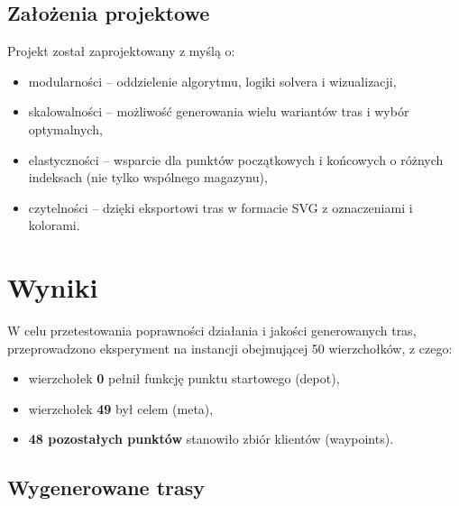 \documentclass{article}
\begin{document}
\subsection*{Założenia projektowe}

Projekt został zaprojektowany z myślą o:
\begin{itemize}
    \item modularności – oddzielenie algorytmu, logiki solvera i wizualizacji,
    \item skalowalności – możliwość generowania wielu wariantów tras i wybór optymalnych,
    \item elastyczności – wsparcie dla punktów początkowych i końcowych o różnych indeksach (nie tylko wspólnego magazynu),
    \item czytelności – dzięki eksportowi tras w formacie SVG z oznaczeniami i kolorami.
\end{itemize}

\section{Wyniki}

W celu przetestowania poprawności działania i jakości generowanych tras, przeprowadzono eksperyment na instancji obejmującej 50 wierzchołków, z czego:
\begin{itemize}
    \item wierzchołek \textbf{0} pełnił funkcję punktu startowego (depot),
    \item wierzchołek \textbf{49} był celem (meta),
    \item \textbf{48 pozostałych punktów} stanowiło zbiór klientów (waypoints).
\end{itemize}

\subsection*{Wygenerowane trasy}
\end{document}
